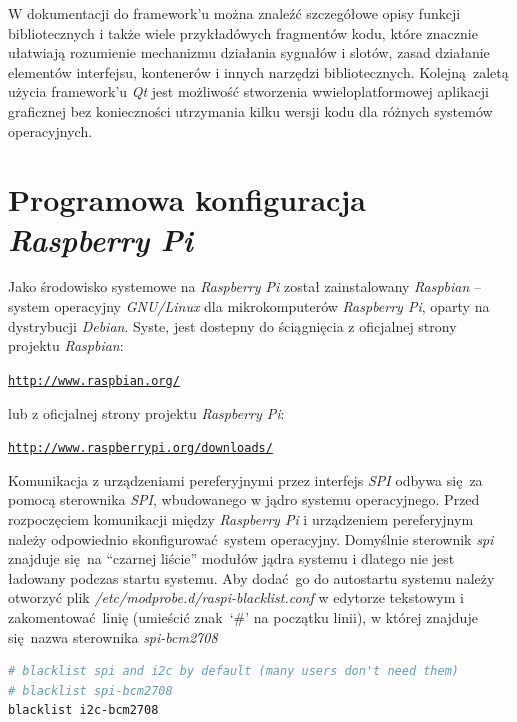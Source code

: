 \documentclass[eng,printmode]{mgr}
\begin{document}
W dokumentacji do framework'u można znaleźć szczegółowe opisy funkcji bibliotecznych i także wiele przykładówych fragmentów kodu, które znacznie ułatwiają rozumienie mechanizmu działania sygnałów i slotów, zasad działanie elementów interfejsu, kontenerów i innych narzędzi bibliotecznych. Kolejną zaletą użycia framework'u \emph{Qt} jest możliwość stworzenia wwieloplatformowej aplikacji graficznej bez konieczności utrzymania kilku wersji kodu dla różnych systemów operacyjnych. 



\section{Programowa konfiguracja \emph{Raspberry Pi}}
Jako środowisko systemowe na \emph{Raspberry Pi} został zainstalowany \emph{Raspbian} -- system operacyjny \emph{GNU/Linux} dla mikrokomputerów \emph{Raspberry Pi}, oparty na dystrybucji \emph{Debian}. Syste, jest dostepny do ściągnięcia z oficjalnej strony projektu \emph{Raspbian}: 

\begin{alltt}
    \url{http://www.raspbian.org/} 
\end{alltt}

lub z oficjalnej strony projektu \emph{Raspberry Pi}:

\begin{alltt}
    \url{http://www.raspberrypi.org/downloads/}
\end{alltt}

Komunikacja z urządzeniami pereferyjnymi przez interfejs \emph{SPI} odbywa się za pomocą sterownika \emph{SPI}, wbudowanego w jądro systemu operacyjnego. Przed rozpoczęciem komunikacji między \emph{Raspberry Pi} i urządzeniem pereferyjnym należy odpowiednio skonfigurować system operacyjny.
Domyślnie sterownik \emph{spi} znajduje się na ``czarnej liście'' modułów jądra systemu i dlatego nie jest ładowany podczas startu systemu.
Aby dodać go do autostartu systemu należy otworzyć plik \emph{/etc/modprobe.d/raspi-blacklist.conf} w edytorze tekstowym i zakomentować linię (umieścić znak `\#' na początku linii), w której znajduje się nazwa sterownika \emph{spi-bcm2708}

\vspace{0.5cm}
\begin{lstlisting}[language=bash,frame=single,caption={Zmodyfikowany plik \emph{/etc/modprobe.d/raspi-blacklist.conf}}]
# blacklist spi and i2c by default (many users don't need them)
# blacklist spi-bcm2708
blacklist i2c-bcm2708
\end{lstlisting}
\end{document}
